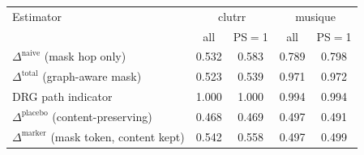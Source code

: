 \begin{tabular}{lcccc}
\toprule
Estimator & \multicolumn{2}{c}{clutrr} & \multicolumn{2}{c}{musique} \\
& all & PS$=$1 & all & PS$=$1 \\
\midrule
$\Delta^{\text{naive}}$ (mask hop only) & 0.532 & 0.583 & 0.789 & 0.798 \\
$\Delta^{\text{total}}$ (graph-aware mask) & 0.523 & 0.539 & 0.971 & 0.972 \\
DRG path indicator & 1.000 & 1.000 & 0.994 & 0.994 \\
$\Delta^{\text{placebo}}$ (content-preserving) & 0.468 & 0.469 & 0.497 & 0.491 \\
$\Delta^{\text{marker}}$ (mask token, content kept) & 0.542 & 0.558 & 0.497 & 0.499 \\
\bottomrule
\end{tabular}
